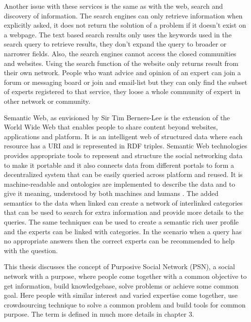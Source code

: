 Another issue with these services is the same as with the web, search and discovery of information. The search engines can only retrieve information when explicitly asked, it does not return the solution of a problem if it doesn't exist on a webpage. The text based search results only uses the keywords used in the search query to retrieve results, they don't expand the query to broader or narrower fields. Also, the search engines cannot access the closed communities and websites. Using the search function of the website only returns result from their own network. People who want advice and opinion of an expert can join a forum or messaging board or join and email-list but they can only find the subset of experts registered to that service, they loose a whole community of expert in other network or community. %


Semantic Web, as envisioned by Sir Tim Berners-Lee is the extension of the World Wide Web that enables people to share content beyond websites, applications and platform. It is an intelligent web of structured data where each resource has a URI and is represented in RDF triples. Semantic Web technologies provides appropriate tools to represent and structure the social networking data to make it portable and it also connects data from different portals to form a decentralized system that can be easily queried across platform and reused. It is machine-readable and ontologies are implemented to describe the data and to give it meaning, understood by both machines and humans \cite{berners2001semantic}. The added semantics to the data when linked can create a network of interlinked categories that can be used to search for extra information and provide more details to the queries. The same techniques can be used to create a semantic rich user profile and the experts can be linked with categories. In the scenario when a query has no appropriate answers then the correct experts can be recommended to help with the question.


This thesis discusses the concept of Purposive Social Network (PSN), a social network with a purpose, where people come together with a common objective to get information, build knowledgebase, solve problems or achieve some common goal. Here people with similar interest and varied expertise come together, use crowdsourcing technique to solve a common problem and build tools for common purpose. The term is defined in much more details in chapter 3.


